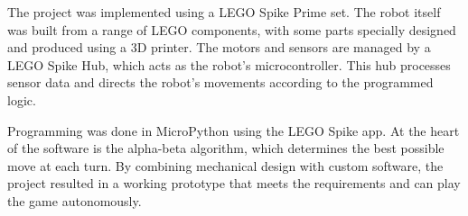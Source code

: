 The project was implemented using a LEGO Spike Prime set. The robot itself was built from a range of LEGO components, with some parts specially designed and produced using a 3D printer. The motors and sensors are managed by a LEGO Spike Hub, which acts as the robot's microcontroller. This hub processes sensor data and directs the robot's movements according to the programmed logic.

Programming was done in MicroPython using the LEGO Spike app. At the heart of the software is the alpha-beta algorithm, which determines the best possible move at each turn. By combining mechanical design with custom software, the project resulted in a working prototype that meets the requirements and can play the game autonomously.

\clearpage